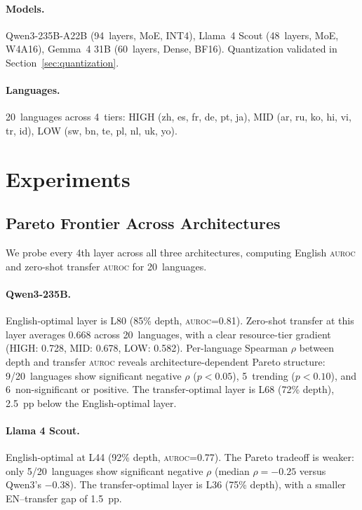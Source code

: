 \documentclass[11pt,a4paper]{article}
\newcommand{\aur}{\textsc{auroc}}
\begin{document}
\paragraph{Models.} Qwen3-235B-A22B (94~layers, MoE, INT4), Llama~4 Scout (48~layers, MoE, W4A16), Gemma~4 31B (60~layers, Dense, BF16). Quantization validated in Section~\ref{sec:quantization}.

\paragraph{Languages.} 20~languages across 4~tiers: HIGH (zh, es, fr, de, pt, ja), MID (ar, ru, ko, hi, vi, tr, id), LOW (sw, bn, te, pl, nl, uk, yo).

\section{Experiments}

\subsection{Pareto Frontier Across Architectures}
\label{sec:pareto}

We probe every 4th layer across all three architectures, computing English \aur{} and zero-shot transfer \aur{} for 20~languages.

\paragraph{Qwen3-235B.} English-optimal layer is L80 (85\% depth, \aur{}=0.81). Zero-shot transfer at this layer averages 0.668 across 20~languages, with a clear resource-tier gradient (HIGH: 0.728, MID: 0.678, LOW: 0.582). Per-language Spearman $\rho$ between depth and transfer \aur{} reveals architecture-dependent Pareto structure: 9/20~languages show significant negative $\rho$ ($p<0.05$), 5~trending ($p<0.10$), and 6~non-significant or positive. The transfer-optimal layer is L68 (72\% depth), 2.5~pp below the English-optimal layer.

\paragraph{Llama 4 Scout.} English-optimal at L44 (92\% depth, \aur{}=0.77). The Pareto tradeoff is weaker: only 5/20~languages show significant negative $\rho$ (median $\rho = -0.25$ versus Qwen3's $-0.38$). The transfer-optimal layer is L36 (75\% depth), with a smaller EN--transfer gap of 1.5~pp.
\end{document}
